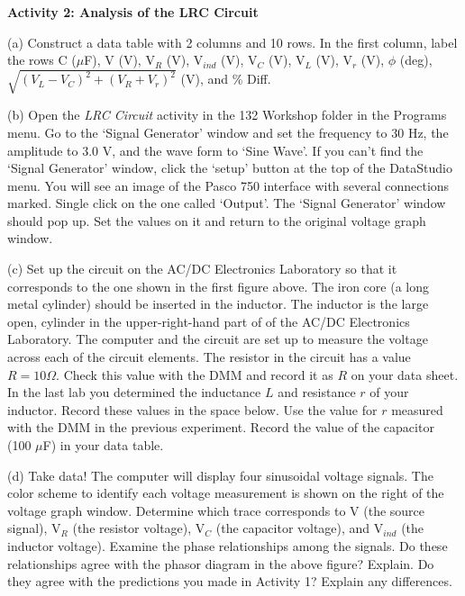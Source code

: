 \newpage

\textbf{Activity 2: Analysis of the LRC Circuit }

(a) Construct a data table with 2 columns and 10 rows. In the first
column, label the rows C (\( \mu  \)F), V (V), V\( _{R} \) (V),
V\( _{ind} \) (V), V\( _{C} \) (V), V\( _{L} \) (V), V\( _{r} \)
(V), \( \phi  \) (deg), \( \sqrt{(V_{L}-V_{C})^{2}+(V_{R}+V_{r})^{2}} \)
(V), and \% Diff.
\vspace{5in}

(b) Open the \emph{LRC Circuit} activity
in the 132 Workshop folder in the Programs menu. 
Go to the `Signal Generator' window and set the frequency to 30 Hz, the amplitude 
to 3.0 V, and the wave form to `Sine Wave'.
If you can't find the `Signal Generator' window, click the `setup' button at
the top of the DataStudio menu.
You will see an image of the Pasco 750 interface with several
connections marked.
Single click on the one called `Output'.
The `Signal Generator' window should pop up. 
Set the values on it and return to the original voltage graph window.

(c) Set up the circuit on the AC/DC Electronics Laboratory so that it corresponds to the one
shown in the first figure above. The iron core (a long metal cylinder)
should be inserted in the inductor.
The inductor is the large open, cylinder in the upper-right-hand part of
of the AC/DC Electronics Laboratory.
The computer and the circuit are set up to measure the voltage
across each of the circuit elements. The resistor in the circuit 
has a value $R=10\Omega$. Check this value with the DMM and record it
as $R$ on your data sheet. In the last lab you determined the inductance
$L$ and resistance $r$ of your inductor. Record these values in the space
below. Use the value for $r$ measured with the DMM in the previous experiment.
Record the value of the capacitor (100 \( \mu  \)F) in your data table.
\vspace{15mm}

(d) Take data! The computer will display four sinusoidal
voltage signals. 
The color scheme to identify each voltage measurement
is shown on the right of the voltage graph window. Determine which trace
corresponds to V (the source signal), V\( _{R} \) (the resistor voltage),
V\( _{C} \) (the capacitor voltage), and V\( _{ind} \) (the inductor voltage).
Examine
the phase relationships among the signals. Do these relationships
agree with the phasor diagram in the above figure? Explain.
Do they agree with the predictions you made in Activity 1?
Explain any differences.
\vspace{20mm}

